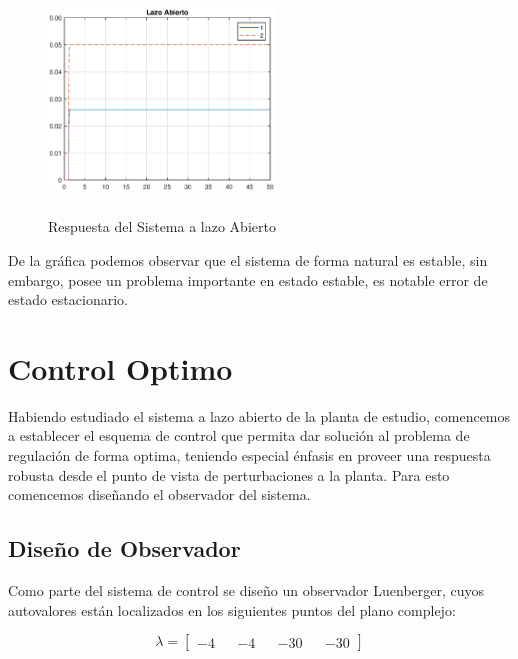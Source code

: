 \documentclass[journal,twoside,web]{ieeecolor}
\begin{document}
	\begin{figure}[h]
		\begin{center}
			\includegraphics[width=6cm,height=6cm,keepaspectratio]{olstepresponse}
			\caption{ Respuesta del Sistema a lazo Abierto \label{olstepresponse}}	\end{center}
	\end{figure}		
	
	De la gráfica podemos observar que el sistema de forma natural es estable, sin embargo, posee un problema importante en estado estable, es notable error de estado estacionario.


\section{Control Optimo}

	Habiendo estudiado el sistema a lazo abierto de la planta de estudio, comencemos a establecer el esquema de control que permita dar solución al problema de regulación de forma optima, teniendo especial énfasis en proveer una respuesta robusta desde el punto de vista de perturbaciones a la planta. Para esto comencemos diseñando el observador del sistema.
	
		
	
	\subsection{Diseño de Observador}
	
	Como parte del sistema de control se diseño un observador Luenberger, cuyos autovalores están localizados en los siguientes puntos del plano complejo:
	
	\begin{equation}
		\lambda = \begin{bmatrix}
				-4 && -4 && -30 && -30
			\end{bmatrix}
	\end{equation}
	
\end{document}
